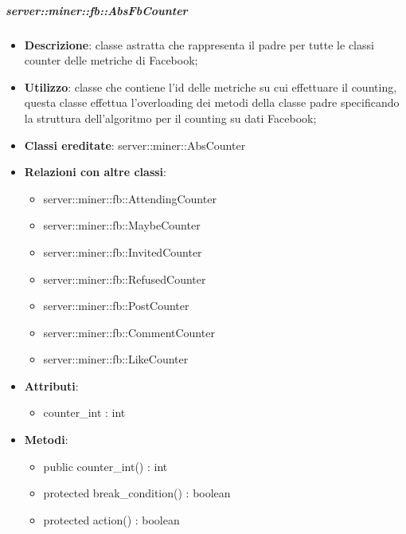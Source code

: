 		\subparagraph{server::miner::fb::AbsFbCounter} %
		\label{subp:server_miner_fb_AbsFbCounter}
			\begin{itemize}
				\item \textbf{Descrizione}: classe astratta che rappresenta il padre per tutte le classi counter delle metriche di Facebook;
				\item \textbf{Utilizzo}: classe che contiene l'id delle metriche su cui effettuare il counting, questa classe effettua l'overloading dei metodi della classe padre specificando la struttura dell'algoritmo per il counting su dati Facebook;
				\item \textbf{Classi ereditate}: server::miner::AbsCounter
				\item \textbf{Relazioni con altre classi}:
					\begin{itemize}
						\item server::miner::fb::AttendingCounter
						\item server::miner::fb::MaybeCounter
						\item server::miner::fb::InvitedCounter
						\item server::miner::fb::RefusedCounter
						\item server::miner::fb::PostCounter
						\item server::miner::fb::CommentCounter
						\item server::miner::fb::LikeCounter
					\end{itemize}
				\item \textbf{Attributi}:  
					\begin{itemize}
						\item counter\_int : int
					\end{itemize}
				\item \textbf{Metodi}:   
					\begin{itemize}
						\item public counter\_int() : int
						\item protected break\_condition() : boolean
						\item protected action() : boolean
					\end{itemize}
			\end{itemize}

